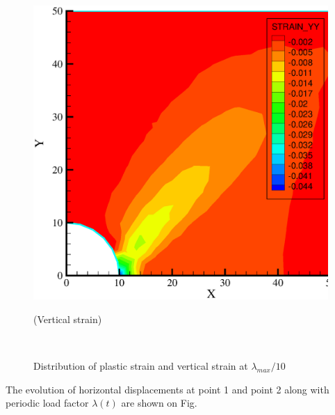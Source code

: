 \begin{figure}[!thb]
\begin{center}
\begin{minipage}[t]{0.48\textwidth}
\begin{center}
    \includegraphics[scale=0.28]{M/ex1_strain_yy_4.1.eps}\\
    \centerline{(Vertical strain)}
    \end{center}
   \end{minipage}\\
  \end{center}
  \caption{Distribution of plastic strain and vertical strain at $\lambda_{max}/10$}
  \label{ex2_cont1}
\end{figure}

The evolution of horizontal displacements at point 1 and point 2
along with periodic load factor $\lambda (t)$ are shown on Fig.

